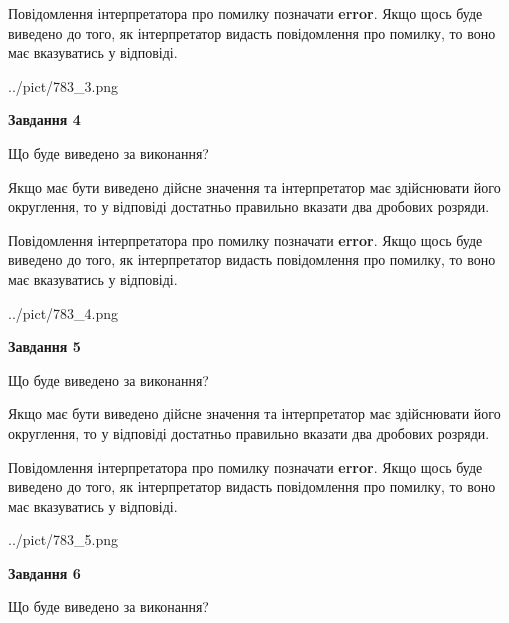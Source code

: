 \documentclass[12pt, ukrainian]{article}
\begin{document}
{\begin {Large}
Повідомлення інтерпретатора про помилку позначати \textbf{error}.
Якщо щось буде виведено до того, як інтерпретатор видасть повідомлення про помилку, 
то воно має вказуватись у відповіді. \par

\begin{center}
	{../pict/783_3.png}
\end{center}
\newpage

{\begin {center}\textbf{Завдання 4}\end {center}}\par
Що буде виведено за виконання? \par

Якщо має бути виведено дійсне значення та інтерпретатор має здійснювати його округлення, 
то у відповіді достатньо правильно вказати два дробових розряди.

Повідомлення інтерпретатора про помилку позначати \textbf{error}.
Якщо щось буде виведено до того, як інтерпретатор видасть повідомлення про помилку, 
то воно має вказуватись у відповіді. \par

\begin{center}
	{../pict/783_4.png}
\end{center}
\newpage

{\begin {center}\textbf{Завдання 5}\end {center}}\par
Що буде виведено за виконання? \par

Якщо має бути виведено дійсне значення та інтерпретатор має здійснювати його округлення, 
то у відповіді достатньо правильно вказати два дробових розряди.

Повідомлення інтерпретатора про помилку позначати \textbf{error}.
Якщо щось буде виведено до того, як інтерпретатор видасть повідомлення про помилку, 
то воно має вказуватись у відповіді. \par

\begin{center}
	{../pict/783_5.png}
\end{center}
\newpage

{\begin {center}\textbf{Завдання 6}\end {center}}\par
Що буде виведено за виконання? \par


\end{Large}}
\end{document}
